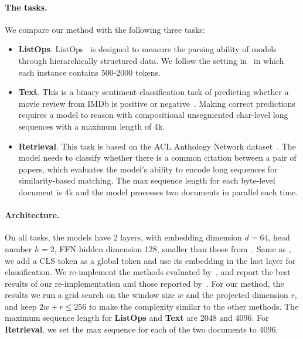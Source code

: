 \paragraph{The tasks.}
We compare our method with the following three tasks: 
\vspace{-0.5em}
\begin{itemize}[leftmargin=1.5em]
    \item \textbf{ListOps}. ListOps~\citep{nangia2018listops} is designed to measure the parsing ability of models through hierarchically structured data. We follow the setting in~\citep{tay2020long} in which each instance contains 500-2000 tokens.
    \item \textbf{Text}. This is a binary sentiment classification task of predicting whether a movie review from IMDb is positive or negative~\citep{maas2011imdb}. Making correct predictions requires a model to reason with compositional unsegmented char-level long sequences with a maximum length of 4k. 
    \item \textbf{Retrieval}. This task is based on the ACL Anthology Network dataset~\citep{radev2013acl}. The model needs to classify whether there is a common citation between a pair of papers, which evaluates the model's ability to encode long sequences for similarity-based matching. The max sequence length for each byte-level document is 4k and the model processes two documents in parallel each time.
\end{itemize}
\vspace{-0.5em}

\paragraph{Architecture.}
On all tasks, the models have 2 layers, with embedding dimension $d=64$, head number $h=2$,
FFN hidden dimension 128, smaller than those from~\citep{tay2020long}. Same as \citep{tay2020long}, we add a CLS token as a global token and use its embedding in the last layer for classification. We re-implement the methods evaluated by~\citet{xiong2021nformer}, and report the best results of our re-implementation and those reported by~\citet{xiong2021nformer}. For our method, the results we run a grid search on the window size $w$ and the projected dimension $r$, and keep $2w+r\le 256$ to make the complexity similar to the other methods. The maximum sequence length for \textbf{ListOps} and \textbf{Text} are 2048 and 4096. For \textbf{Retrieval}, we set the max sequence for each of the two documents to 4096.

